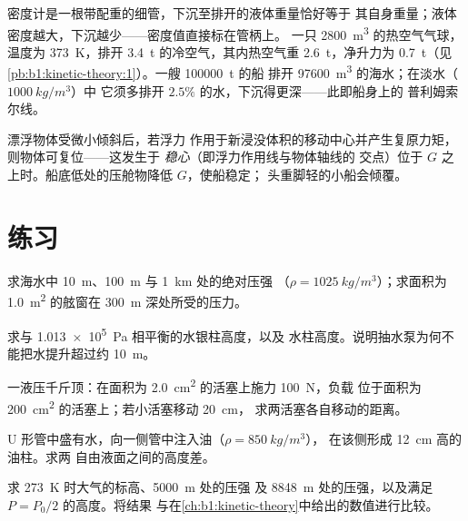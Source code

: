 \begin{example}[三个浮力的例子]\label{ex:b1:fluid-statics:buoy}
密度计是一根带配重的细管，下沉至排开的液体重量恰好等于
其自身重量；液体密度越大，下沉越少——密度值直接标在管柄上。
一只 \qty{2800}{m^3} 的热空气气球，温度为 \qty{373}{K}，排开
\qty{3.4}{t} 的冷空气，其内热空气重 \qty{2.6}{t}，净升力为
\qty{0.7}{t}（见\cref{pb:b1:kinetic-theory:1}）。一艘 \qty{100000}{t} 的船
排开 \qty{97600}{m^3} 的海水；在淡水（$\qty{1000}{kg/m^3}$）中
它须多排开 $2.5\%$ 的水，下沉得更深——此即船身上的
普利姆索尔线。
\end{example}

\begin{remark}[稳定性]\label{rem:b1:fluid-statics:stability}
漂浮物体受微小倾斜后，若浮力
作用于新浸没体积的移动中心并产生复原力矩，则物体可复位——这发生于
\emph{稳心}（即浮力作用线与物体轴线的
交点）位于
$G$ 之上时。船底低处的压舱物降低 $G$，使船稳定；
头重脚轻的小船会倾覆。
\end{remark}

\section{练习}

\begin{exercise}[$\star$]\label{exo:b1:fluid-statics:1}
求海水中 \qty{10}{m}、\qty{100}{m} 与 \qty{1}{km} 处的绝对压强
（$\rho = \qty{1025}{kg/m^3}$）；求面积为 \qty{1.0}{m^2}
的舷窗在 \qty{300}{m} 深处所受的压力。
\end{exercise}

\begin{exercise}[$\star$]\label{exo:b1:fluid-statics:2}
求与 \qty{1.013e5}{Pa} 相平衡的水银柱高度，以及
水柱高度。说明抽水泵为何不能把水提升超过约 \qty{10}{m}。
\end{exercise}

\begin{exercise}[$\star$]\label{exo:b1:fluid-statics:3}
一液压千斤顶：在面积为 \qty{2.0}{cm^2} 的活塞上施力 \qty{100}{N}，负载
位于面积为 \qty{200}{cm^2} 的活塞上；若小活塞移动 \qty{20}{cm}，
求两活塞各自移动的距离。
\end{exercise}

\begin{exercise}[$\star$]\label{exo:b1:fluid-statics:4}
U 形管中盛有水，向一侧管中注入油（$\rho = \qty{850}{kg/m^3}$），
在该侧形成 \qty{12}{cm} 高的油柱。求两
自由液面之间的高度差。
\end{exercise}

\begin{exercise}[$\star\star$]\label{exo:b1:fluid-statics:5}
求 \qty{273}{K} 时大气的标高、\qty{5000}{m} 处的压强
及 \qty{8848}{m} 处的压强，以及满足 $P = P_0/2$ 的高度。将结果
与在\cref{ch:b1:kinetic-theory}中给出的数值进行比较。
\end{exercise}


